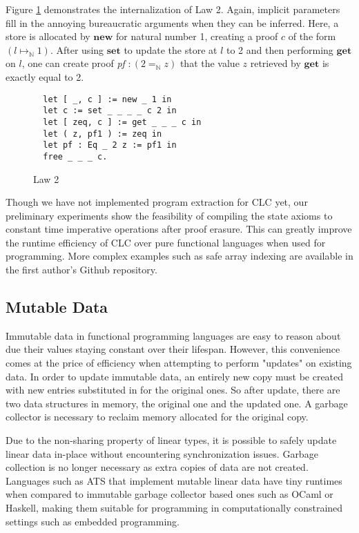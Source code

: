 \documentclass[sigplan,screen]{acmart}
\theoremstyle{definition}
\newcommand{\new}{\textbf{new}}
\newcommand{\get}{\textbf{get}}
\newcommand{\set}{\textbf{set}}
\begin{document}
  Figure \ref{law2} demonstrates the internalization of Law 2. Again, implicit parameters fill in the annoying bureaucratic arguments when they can be inferred. Here, a store is allocated by $\new$ for natural number 1, creating a proof $c$ of the form $(l \mapsto_\mathbb{N} 1)$. After using $\set$ to update the store at $l$ to 2 and then performing $\get$ on $l$, one can create proof \textit{pf} $: (2 =_\mathbb{N} z)$ that the value $z$ retrieved by $\get$ is exactly equal to 2.

  \begin{figure}[h]
  \vspace{-0.6em}
  \caption{Law 2}
  \begin{lstlisting}
  let [ _, c ] := new _ 1 in
  let c := set _ _ _ _ c 2 in
  let [ zeq, c ] := get _ _ _ c in
  let ( z, pf1 ) := zeq in
  let pf : Eq _ 2 z := pf1 in
  free _ _ _ c.
  \end{lstlisting}
  \vspace{-0.6em}
  \label{law2}
  \Description{}
  \end{figure}

  Though we have not implemented program extraction for CLC yet, our preliminary experiments show the feasibility of compiling the state axioms to constant time imperative operations after proof erasure. This can greatly improve the runtime efficiency of CLC over pure functional languages when used for programming. More complex examples such as safe array indexing are available in the first author's Github repository.

  \subsection{Mutable Data}
  Immutable data in functional programming languages are easy to reason about due their values staying constant over their lifespan. However, this convenience comes at the price of efficiency when attempting to perform "updates" on existing data. In order to update immutable data, an entirely new copy must be created with new entries substituted in for the original ones. So after update, there are two data structures in memory, the original one and the updated one. A garbage collector is necessary to reclaim memory allocated for the original copy.

  Due to the non-sharing property of linear types, it is possible to safely update linear data in-place without encountering synchronization issues. Garbage collection is no longer necessary as extra copies of data are not created. Languages such as ATS that implement mutable linear data have tiny runtimes when compared to immutable garbage collector based ones such as OCaml or Haskell, making them suitable for programming in computationally constrained settings such as embedded programming.
\end{document}
